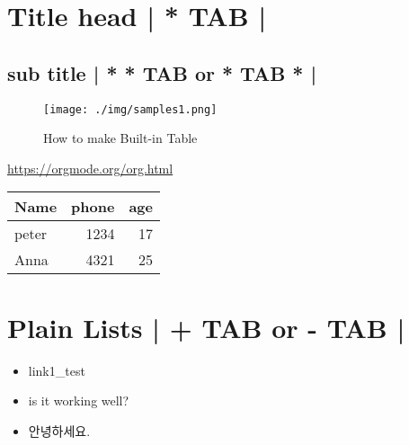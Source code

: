 \documentclass[11pt]{article}
\author{JJ Kim}
\date{\today}
\title{}
\begin{document}
\tableofcontents

\section{Title head  | *  TAB |}
\label{sec:org67ad975}
\subsection{sub title | * * TAB or * TAB * |}
\label{sec:orga7860dd}
\begin{figure}[htbp]
\centering
\texttt{[image: ./img/samples1.png]}
\caption{\label{fig:a-1}How to make Built-in Table}
\end{figure}
\url{https://orgmode.org/org.html}

\begin{center}
\begin{tabular}{lrr}
Name & phone & age\\
\hline
peter & 1234 & 17\\
Anna & 4321 & 25\\
\end{tabular}
\end{center}

\section{Plain Lists | + TAB or - TAB |}
\label{sec:orgcd387ac}
\begin{itemize}
\item link1\_test
\item is it working well?
\item 안녕하세요.
\end{itemize}
\end{document}
